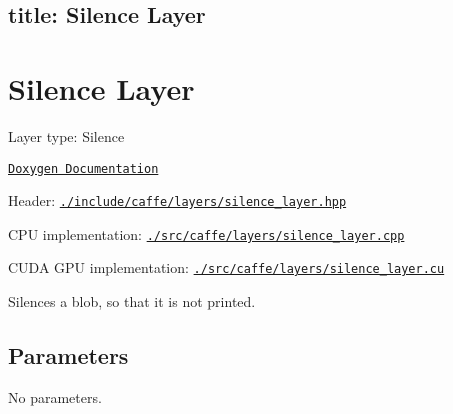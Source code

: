

 \subsection*{title\+: Silence Layer }

\section*{Silence Layer}


\begin{DoxyItemize}
\item Layer type\+: {\ttfamily Silence}
\item \href{http://caffe.berkeleyvision.org/doxygen/classcaffe_1_1SilenceLayer.html}{\tt Doxygen Documentation}
\item Header\+: \href{https://github.com/BVLC/caffe/blob/master/include/caffe/layers/silence_layer.hpp}{\tt {\ttfamily ./include/caffe/layers/silence\+\_\+layer.hpp}}
\item C\+PU implementation\+: \href{https://github.com/BVLC/caffe/blob/master/src/caffe/layers/silence_layer.cpp}{\tt {\ttfamily ./src/caffe/layers/silence\+\_\+layer.cpp}}
\item C\+U\+DA G\+PU implementation\+: \href{https://github.com/BVLC/caffe/blob/master/src/caffe/layers/silence_layer.cu}{\tt {\ttfamily ./src/caffe/layers/silence\+\_\+layer.cu}}
\end{DoxyItemize}

Silences a blob, so that it is not printed.

\subsection*{Parameters}

No parameters. 